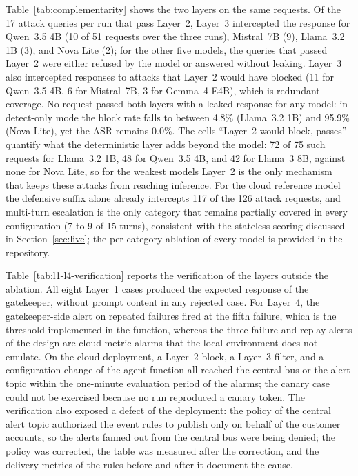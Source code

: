 Table~\ref{tab:complementarity} shows the two layers on the same requests. Of the 17 attack queries per run that pass Layer~2, Layer~3 intercepted the response for Qwen~3.5 4B (10 of 51 requests over the three runs), Mistral~7B (9), Llama~3.2 1B (3), and Nova Lite (2); for the other five models, the queries that passed Layer~2 were either refused by the model or answered without leaking. Layer~3 also intercepted responses to attacks that Layer~2 would have blocked (11 for Qwen~3.5 4B, 6 for Mistral~7B, 3 for Gemma~4 E4B), which is redundant coverage. No request passed both layers with a leaked response for any model: in detect-only mode the block rate falls to between 4.8\% (Llama~3.2 1B) and 95.9\% (Nova Lite), yet the ASR remains 0.0\%. The cells ``Layer~2 would block, passes'' quantify what the deterministic layer adds beyond the model: 72 of 75 such requests for Llama~3.2 1B, 48 for Qwen~3.5 4B, and 42 for Llama~3 8B, against none for Nova Lite, so for the weakest models Layer~2 is the only mechanism that keeps these attacks from reaching inference. For the cloud reference model the defensive suffix alone already intercepts 117 of the 126 attack requests, and multi-turn escalation is the only category that remains partially covered in every configuration (7 to 9 of 15 turns), consistent with the stateless scoring discussed in Section~\ref{sec:live}; the per-category ablation of every model is provided in the repository.

Table~\ref{tab:l1-l4-verification} reports the verification of the layers outside the ablation. All eight Layer~1 cases produced the expected response of the gatekeeper, without prompt content in any rejected case. For Layer~4, the gatekeeper-side alert on repeated failures fired at the fifth failure, which is the threshold implemented in the function, whereas the three-failure and replay alerts of the design are cloud metric alarms that the local environment does not emulate. On the cloud deployment, a Layer~2 block, a Layer~3 filter, and a configuration change of the agent function all reached the central bus or the alert topic within the one-minute evaluation period of the alarms; the canary case could not be exercised because no run reproduced a canary token. The verification also exposed a defect of the deployment: the policy of the central alert topic authorized the event rules to publish only on behalf of the customer accounts, so the alerts fanned out from the central bus were being denied; the policy was corrected, the table was measured after the correction, and the delivery metrics of the rules before and after it document the cause.


